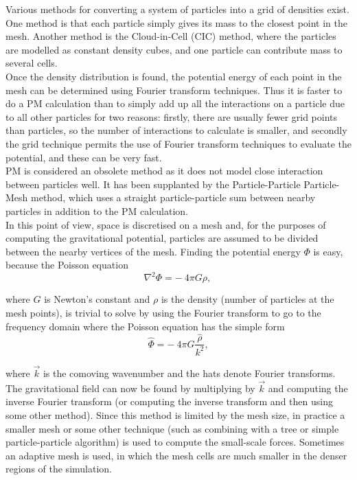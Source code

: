 \documentclass[10pt]{article}
\begin{document}
Various methods for converting a system of particles into a grid of densities exist. One method is that each particle simply gives its mass to the closest point in the mesh. Another method is the Cloud-in-Cell (CIC) method, where the particles are modelled as constant density cubes, and one particle can contribute mass to several cells.\\

Once the density distribution is found, the potential energy of each point in the mesh can be determined using Fourier transform techniques. Thus it is faster to do a PM calculation than to simply add up all the interactions on a particle due to all other particles for two reasons: firstly, there are usually fewer grid points than particles, so the number of interactions to calculate is smaller, and secondly the grid technique permits the use of Fourier transform techniques to evaluate the potential, and these can be very fast.\\

PM is considered an obsolete method as it does not model close interaction between particles well. It has been supplanted by the Particle-Particle Particle-Mesh method, which uses a straight particle-particle sum between nearby particles in addition to the PM calculation.\\

In this point of view, space is discretised on a mesh and, for the purposes of computing the gravitational potential, particles are assumed to be divided between the nearby vertices of the mesh. Finding the potential energy $\Phi$ is easy, because the Poisson equation\\

\begin{equation}
    \nabla^2\Phi= -\ 4\pi G{\rho},\,
\end{equation}

where $G$ is Newton's constant and $\rho$ is the density (number of particles at the mesh points), is trivial to solve by using the Fourier transform to go to the frequency domain where the Poisson equation has the simple form \\

\begin{equation}
    \hat{\Phi}= -\ 4\pi G\frac{\hat{\rho}}{k^2},
\end{equation}

where $\vec{k}$ is the comoving wavenumber and the hats denote Fourier transforms. The gravitational field can now be found by multiplying by $\vec{k}$ and computing the inverse Fourier transform (or computing the inverse transform and then using some other method). Since this method is limited by the mesh size, in practice a smaller mesh or some other technique (such as combining with a tree or simple particle-particle algorithm) is used to compute the small-scale forces. Sometimes an adaptive mesh is used, in which the mesh cells are much smaller in the denser regions of the simulation.\\
\end{document}
